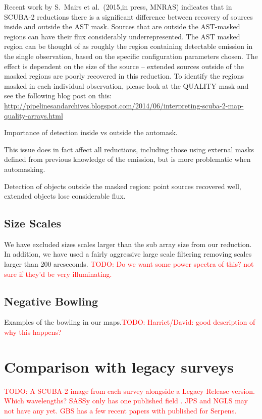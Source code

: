 \documentclass[usenatbib]{mnras}
\newcommand{\todo}[1]{\textcolor{red}{TODO: #1}}
\begin{document}
Recent work by S.~Mairs et al.~(2015,in press, MNRAS) indicates that
in SCUBA-2 reductions there is a significant difference between
recovery of sources inside and outside the AST mask. Sources that are
outside the AST-masked regions can have their flux considerably
underrepresented. The AST masked region can be thought of as roughly
the region containing detectable emission in the single observation,
based on the specific configuration parameters chosen. The effect is
dependent on the size of the source -- extended sources outside of the
masked regions are poorly recovered in this reduction. To identify the
regions masked in each individual observation, please look at the
QUALITY mask and see the following blog post on this:
\url{http://pipelinesandarchives.blogspot.com/2014/06/interpreting-scuba-2-map-quality-arrays.html}

Importance of detection inside vs outside the automask.

This issue does in fact affect all reductions, including those using
external masks defined from previous knowledge of the emission, but
is more problematic when automasking.

Detection of objects outside the masked region: point sources
recovered well, extended objects lose considerable flux.


\subsection{Size Scales}
We have excluded sizes scales larger than the sub array size from our
reduction. In addition, we have used a fairly aggressive large scale
filtering removing scales larger than 200 arcseconds.
\todo{Do we want some power spectra of this? not sure if they'd be very illuminating.}

\subsection{Negative Bowling}
Examples of the bowling in our maps.\todo{Harriet/David: good description of why this happens?}

\section{Comparison with legacy surveys}

\todo{A SCUBA-2 image from each survey alongside a Legacy Release
  version. Which wavelengths? SASSy only has one published field
  \citep{MacKenzie2011}. JPS and NGLS may not have any yet. GBS has a
  few recent papers with \citet{Rumble2015} published for Serpens.}
\end{document}
